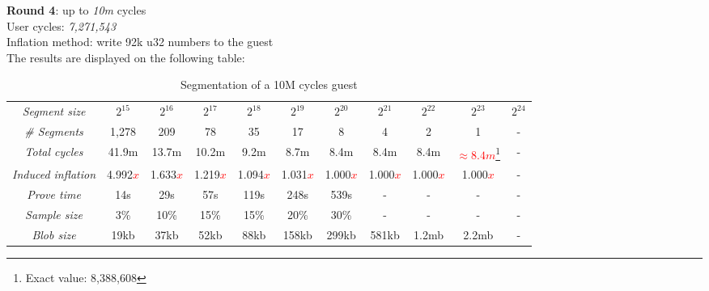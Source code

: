 \documentclass[a4paper, 10pt]{article}
\begin{document}
\par \noindent
\textbf{Round 4}: up to \textit{10m} cycles\\
User cycles: \textit{7,271,543}\\
Inflation method: write 92k u32 numbers to the guest\\
The results are displayed on the following table:
\begin{table}[H]
  	\begin{center}
    \label{tab:table5}
    \begin{minipage}{\textwidth}
    \begin{adjustbox}{width=\textwidth}
    \begin{tabular}{c|c|c|c|c|c|c|c|c|c|c}
	  \textit{Segment size} & $2^{15}$ & $2^{16}$ & $2^{17}$ & $2^{18}$ & $2^{19}$ & $2^{20}$ & $2^{21}$ & $2^{22}$ & $2^{23}$ & $2^{24}$\\
	  \textit{\# Segments} & 1,278 & 209 & 78 & 35 & 17 & 8 & 4 & 2 & 1 & -\\
	  \textit{Total cycles} & 41.9m & 13.7m & 10.2m & 9.2m & 8.7m & 8.4m & 8.4m & 8.4m & \textcolor{red}{$\approx 8.4m$}\footnote{Exact value: 8,388,608} & -\\
	  \textit{Induced inflation} & 4.992\textcolor{red}{$x$} & 1.633\textcolor{red}{$x$} & 1.219\textcolor{red}{$x$} & 1.094\textcolor{red}{$x$} & 1.031\textcolor{red}{$x$} & 1.000\textcolor{red}{$x$} & 1.000\textcolor{red}{$x$} & 1.000\textcolor{red}{$x$} & 1.000\textcolor{red}{$x$} & -\\
	  \textit{Prove time} & 14s & 29s & 57s & 119s & 248s & 539s & - & - & - & -\\
	  \textit{Sample size} & 3\% & 10\% & 15\% & 15\% & 20\% & 30\% & - & - & - & -\\
	  \textit{Blob size} & 19kb & 37kb & 52kb & 88kb &158kb & 299kb & 581kb & 1.2mb & 2.2mb & -\\
   	\end{tabular}
   	\end{adjustbox}
   	\end{minipage}
    \caption{Segmentation of a 10M cycles guest}
  \end{center}
\end{table}
\end{document}
